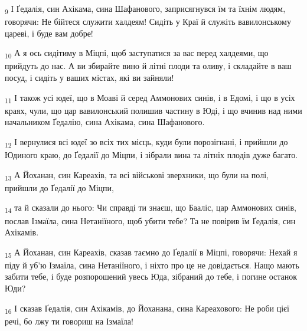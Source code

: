 \begin{tcolorbox}
\textsubscript{9} І Ґедалія, син Ахікама, сина Шафанового, заприсягнувся їм та їхнім людям, говорячи: Не бійтеся служити халдеям! Сидіть у Краї й служіть вавилонському цареві, і буде вам добре!
\end{tcolorbox}
\begin{tcolorbox}
\textsubscript{10} А я ось сидітиму в Міцпі, щоб заступатися за вас перед халдеями, що прийдуть до нас. А ви збирайте вино й літні плоди та оливу, і складайте в ваш посуд, і сидіть у ваших містах, які ви зайняли!
\end{tcolorbox}
\begin{tcolorbox}
\textsubscript{11} І також усі юдеї, що в Моаві й серед Аммонових синів, і в Едомі, і що в усіх краях, чули, що цар вавилонський полишив частину в Юді, і що вчинив над ними начальником Ґедалію, сина Ахікама, сина Шафанового.
\end{tcolorbox}
\begin{tcolorbox}
\textsubscript{12} І вернулися всі юдеї зо всіх тих місць, куди були порозігнані, і прийшли до Юдиного краю, до Ґедалії до Міцпи, і зібрали вина та літніх плодів дуже багато.
\end{tcolorbox}
\begin{tcolorbox}
\textsubscript{13} А Йоханан, син Кареахів, та всі військові зверхники, що були на полі, прийшли до Ґедалії до Міцпи,
\end{tcolorbox}
\begin{tcolorbox}
\textsubscript{14} та й сказали до нього: Чи справді ти знаєш, що Бааліс, цар Аммонових синів, послав Ізмаїла, сина Нетаніїного, щоб убити тебе? Та не повірив їм Ґедалія, син Ахікамів.
\end{tcolorbox}
\begin{tcolorbox}
\textsubscript{15} А Йоханан, син Кареахів, сказав таємно до Ґедалії в Міцпі, говорячи: Нехай я піду й уб'ю Ізмаїла, сина Нетаніїного, і ніхто про це не довідається. Нащо мають забити тебе, і буде розпорошений увесь Юда, зібраний до тебе, і погине останок Юди?
\end{tcolorbox}
\begin{tcolorbox}
\textsubscript{16} І сказав Ґедалія, син Ахікамів, до Йоханана, сина Кареахового: Не роби цієї речі, бо лжу ти говориш на Ізмаїла!
\end{tcolorbox}
